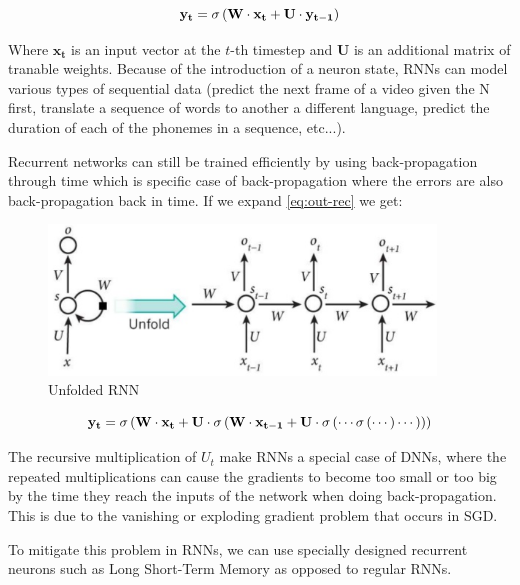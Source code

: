 \begin{equation}
    \centering
    \mathbf{y_t} = \sigma \left ( \mathbf{W} \cdot \mathbf{x_t} + \mathbf{U} \cdot \mathbf{y_{t-1}} \right )
    \label{eq:out-rec}
\end{equation}

Where $\mathbf{x_t}$ is an input vector at the $t$-th timestep and $\mathbf{U}$ is an additional matrix of tranable weights. Because of the introduction of a neuron state, RNNs can model various types of sequential data (predict the next frame of a video given the N first, translate a sequence of words to another a different language, predict the duration of each of the phonemes in a sequence, etc...).

Recurrent networks can still be trained efficiently by using back-propagation through time \cite{werbos1990backpropagation} which is specific case of back-propagation where the errors are also back-propagation back in time. If we expand \ref{eq:out-rec} we get:

\begin{figure}
    \centering
    \includegraphics[height=4cm]{figures/unfold}
    \caption{Unfolded RNN}
    \label{fig:unfold}
\end{figure}

\begin{equation}
    \centering
    \mathbf{y_t} = \sigma \left ( \mathbf{W} \cdot \mathbf{x_t} + \mathbf{U} \cdot \sigma \left ( \mathbf{W} \cdot \mathbf{x_{t-1}} + \mathbf{U} \cdot \sigma \left ( \cdots \sigma \left ( \cdots \right ) \cdots \right ) \right ) \right )
    \label{eq:out-rec-expanded}
\end{equation}

The recursive multiplication of $U_t$ make RNNs a special case of DNNs, where the repeated multiplications can cause the gradients to become too small or too big by the time they reach the inputs of the network when doing back-propagation. This is due to the vanishing or exploding gradient problem \cite{bengio1994learning} that occurs in SGD.

To mitigate this problem in RNNs, we can use specially designed recurrent neurons such as Long Short-Term Memory as opposed to regular RNNs.

